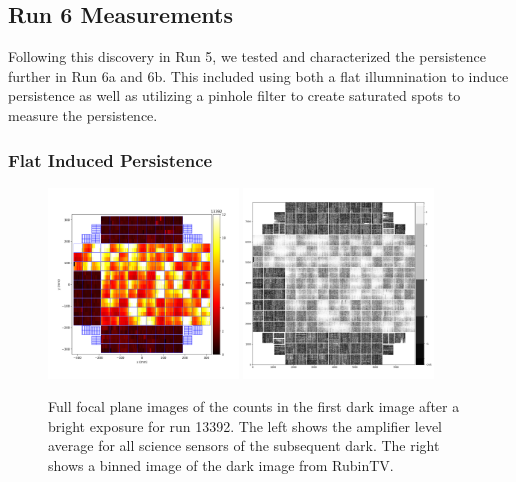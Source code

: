 \documentclass[DM,authoryear,toc]{lsstdoc}
\begin{document}
\subsection{Run 6 Measurements}
Following this discovery in Run 5, we tested and characterized the persistence further in Run 6a and 6b. 
This included using both a flat illumnination to induce persistence as well as utilizing a pinhole filter to create saturated spots to measure the persistence.

\subsubsection{Flat Induced Persistence}
\begin{figure}[!htp]
  \centering
  \includegraphics[width=0.45\textwidth, angle=0]{Run_13392_Persistence.png}
  \includegraphics[width=0.45\textwidth, angle=0]{Persistence_Flat_Example.png}
  \caption{
  Full focal plane images of the counts in the first dark image after a bright exposure for run 13392.
  The left shows the amplifier level average for all science sensors of the subsequent dark.
  The right shows a binned image of the dark image from RubinTV\@.
  }\label{fig:Flat_Induced}
\end{figure}
\end{document}
